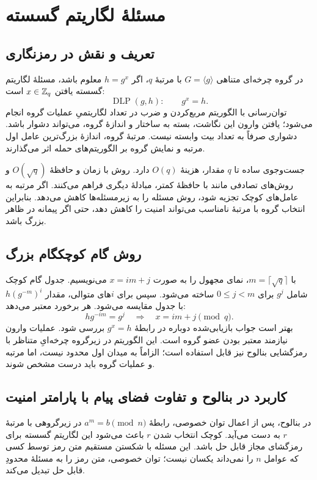 \chapter{مسئلۀ لگاریتم گسسته}
\label{app:dlp}
\section{تعریف و نقش در رمزنگاری}
در گروه چرخه‌ای متناهی $G=\langle g\rangle$ با مرتبۀ $q$، اگر $h=g^x$ معلوم باشد، مسئلۀ لگاریتم گسسته یافتن $x\in\mathbb{Z}_q$ است:
\begin{equation}
\operatorname{DLP}(g,h):\qquad g^x=h.
\end{equation}
توان‌رسانی با الگوریتم مربع‌کردن و ضرب در تعداد لگاریتمیِ عملیات گروه انجام می‌شود؛ یافتن وارون این نگاشت، بسته به ساختار و اندازۀ گروه، می‌تواند دشوار باشد. دشواری صرفاً به تعداد بیت وابسته نیست. مرتبۀ گروه، اندازۀ بزرگ‌ترین عامل اول مرتبه و نمایش گروه بر الگوریتم‌های حمله اثر می‌گذارند.

جست‌وجوی ساده تا $q$ مقدار، هزینۀ $O(q)$ دارد. روش  با زمان و حافظۀ $O(\sqrt q)$ و روش‌های تصادفی مانند  با حافظۀ کمتر، مبادلۀ دیگری فراهم می‌کنند. اگر مرتبه به عامل‌های کوچک تجزیه شود، روش  مسئله را به زیرمسئله‌ها کاهش می‌دهد. بنابراین انتخاب گروه با مرتبۀ نامناسب می‌تواند امنیت را کاهش دهد، حتی اگر پیمانه در ظاهر بزرگ باشد.

\section{روش گام کوچک\lr{--}گام بزرگ}
با $m=\lceil\sqrt q\rceil$، نمای مجهول را به صورت $x=im+j$ می‌نویسیم. جدول گام کوچک شامل $g^j$ برای $0\le j<m$ ساخته می‌شود. سپس برای $i$های متوالی، مقدار $h(g^{-m})^i$ با جدول مقایسه می‌شود. هر برخورد معتبر می‌دهد:
\begin{equation}
h g^{-im}=g^j\quad\Longrightarrow\quad x=im+j\pmod q.
\end{equation}
بهتر است جواب بازیابی‌شده دوباره در رابطۀ $g^x=h$ بررسی شود. عملیات وارون نیازمند معتبر بودن عضو گروه است. این الگوریتم در زیرگروه چرخه‌ایِ متناظر با رمزگشایی بنالوح نیز قابل استفاده است؛ الزاماً به میدان اول محدود نیست، اما مرتبه و عملیات گروه باید درست مشخص شوند.

\section{کاربرد در بنالوح و تفاوت فضای پیام با پارامتر امنیت}
در بنالوح، پس از اعمال توان خصوصی، رابطۀ $a^m=b\pmod n$ در زیرگروهی با مرتبۀ $r$ به دست می‌آید. کوچک انتخاب شدن $r$ باعث می‌شود این لگاریتم گسسته برای رمزگشای مجاز قابل حل باشد. این مسئله با شکستن مستقیم متن رمز توسط کسی که عوامل $n$ را نمی‌داند یکسان نیست؛ توان خصوصی، متن رمز را به مسئلۀ محدودِ قابل حل تبدیل می‌کند.


